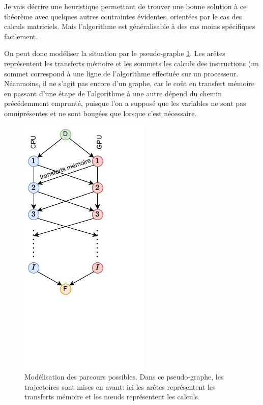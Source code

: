 \documentclass[svgnames,dvipsnames,a4paper,10pt,french]{report}
\begin{document}
\begin{appendices}
Je vais décrire une heuristique permettant de trouver une bonne solution  à ce théorème avec quelques autres contraintes évidentes, orientées par le cas des calculs matriciels. Mais l'algorithme est généralisable à des cas moins spécifiques facilement.



On peut donc modéliser la situation par le pseudo-graphe \ref{fig:parcours_GPU_CPU}. Les arêtes représentent les transferts mémoire et les sommets les calculs des instructions (un sommet correspond à une ligne de l'algorithme effectuée sur un processeur. Néanmoins, il ne s'agit pas encore d'un graphe, car le coût en transfert mémoire en passant d'une étape de l'algorithme à une autre dépend du chemin précédemment emprunté, puisque l'on a supposé que les variables ne sont pas omniprésentes et ne sont bougées que lorsque c'est nécessaire. 

\begin{figure}
    \centering
    \includegraphics[width=.3\textwidth]{images/CPU_GPU_concept.pdf}
    \caption{Modélisation des  parcours possibles. Dans ce pseudo-graphe, les trajectoires sont mises en avant: ici les arêtes représentent les transferts mémoire et les n\oe{}uds représentent les calculs.}
    \label{fig:parcours_GPU_CPU}
\end{figure}






\end{appendices}
\end{document}
